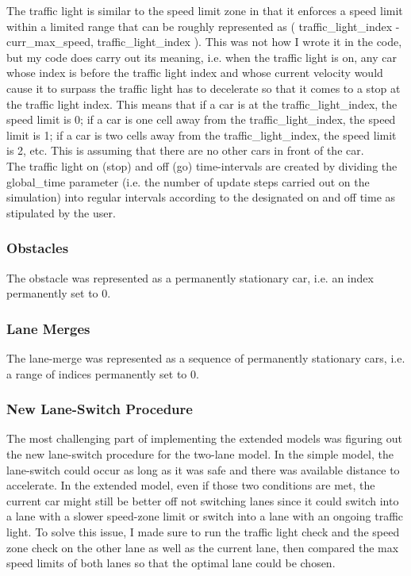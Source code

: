 \documentclass[11pt]{article}
\begin{document}
The traffic light is similar to the speed limit zone in that it enforces
a speed limit within a limited range that can be roughly represented as
( traffic\_light\_index - curr\_max\_speed, traffic\_light\_index ).
This was not how I wrote it in the code, but my code does carry out its
meaning, i.e. when the traffic light is on, any car whose index is
before the traffic light index and whose current velocity would cause it
to surpass the traffic light has to decelerate so that it comes to a
stop at the traffic light index. This means that if a car is at the
traffic\_light\_index, the speed limit is 0; if a car is one cell away
from the traffic\_light\_index, the speed limit is 1; if a car is two
cells away from the traffic\_light\_index, the speed limit is 2, etc.
This is assuming that there are no other cars in front of the car.\\

The traffic light on (stop) and off (go) time-intervals are created by
dividing the global\_time parameter (i.e. the number of update steps
carried out on the simulation) into regular intervals according to the
designated on and off time as stipulated by the user.

\subsubsection{Obstacles}

The obstacle was represented as a permanently stationary car, i.e. an
index permanently set to 0.

\subsubsection{Lane Merges}

The lane-merge was represented as a sequence of permanently stationary
cars, i.e. a range of indices permanently set to 0.

\subsubsection{New Lane-Switch Procedure}

The most challenging part of implementing the extended models was
figuring out the new lane-switch procedure for the two-lane model. In
the simple model, the lane-switch could occur as long as it was safe and
there was available distance to accelerate. In the extended model, even
if those two conditions are met, the current car might still be better
off not switching lanes since it could switch into a lane with a slower
speed-zone limit or switch into a lane with an ongoing traffic light. To
solve this issue, I made sure to run the traffic light check and the
speed zone check on the other lane as well as the current lane, then
compared the max speed limits of both lanes so that the optimal lane
could be chosen.
\end{document}
